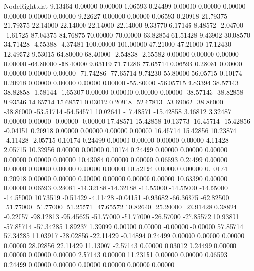 \begin{filecontents}{NodeRight.dat}
   9.13464    0.00000    0.00000     0.06593    0.24499    0.00000    0.00000    0.00000    0.00000    0.00000    0.00000
   9.22627    0.00000    0.00000     0.06593    0.20918   21.79375   21.79375   22.14000   22.14000   22.14000   22.14000
   9.33770    6.17146    8.48572    -2.04700   -1.61725   87.04375   84.76875   70.00000   70.00000   63.82854   61.51428
   9.43902   30.08570   34.71428    -4.55388   -4.37481  100.00000  100.00000   47.21000   47.21000   17.12430   12.49572
   9.53015   64.80000   68.40000    -2.54838   -2.65582    0.00000    0.00000    0.00000    0.00000  -64.80000  -68.40000
   9.63119   71.74286   77.65714     0.06593    0.28081    0.00000    0.00000    0.00000    0.00000  -71.74286  -77.65714
   9.74230   55.80000   56.05715     0.10174    0.20918    0.00000    0.00000    0.00000    0.00000  -55.80000  -56.05715
   9.83394   38.57143   38.82858    -1.58144   -1.65307    0.00000    0.00000    0.00000    0.00000  -38.57143  -38.82858
   9.93546   14.65714   15.68571     0.03012    0.20918  -52.67813  -53.69062  -38.86000  -38.86000  -53.51714  -54.54571
  10.02641  -17.48571  -15.42858     3.46812    3.32487    0.00000    0.00000   -0.00000   -0.00000   17.48571   15.42858
  10.13773  -16.45714  -15.42856    -0.04151    0.20918    0.00000    0.00000    0.00000    0.00000   16.45714   15.42856
  10.23874   -4.11428   -2.05715     0.10174    0.24499    0.00000    0.00000    0.00000    0.00000    4.11428    2.05715
  10.32956    0.00000    0.00000     0.10174    0.24499    0.00000    0.00000    0.00000    0.00000    0.00000    0.00000
  10.43084    0.00000    0.00000     0.06593    0.24499    0.00000    0.00000    0.00000    0.00000    0.00000    0.00000
  10.52194    0.00000    0.00000     0.10174    0.20918    0.00000    0.00000    0.00000    0.00000    0.00000    0.00000
  10.63390    0.00000    0.00000     0.06593    0.28081  -14.32188  -14.32188  -14.55000  -14.55000  -14.55000  -14.55000
  10.73519   -0.51429   -4.11428    -0.04151   -0.93682  -66.36875  -62.82500  -51.77000  -51.77000  -51.25571  -47.65572
  10.82640  -25.20000  -23.91428     0.38824   -0.22057  -98.12813  -95.45625  -51.77000  -51.77000  -26.57000  -27.85572
  10.93801  -57.85714  -57.34285     1.89237    1.39099    0.00000    0.00000   -0.00000   -0.00000   57.85714   57.34285
  11.03917  -28.02856  -22.11429    -0.14894    0.24499    0.00000    0.00000    0.00000    0.00000   28.02856   22.11429
  11.13007   -2.57143    0.00000     0.03012    0.24499    0.00000    0.00000    0.00000    0.00000    2.57143    0.00000
  11.23151    0.00000    0.00000     0.06593    0.24499    0.00000    0.00000    0.00000    0.00000    0.00000    0.00000

\end{filecontents}
